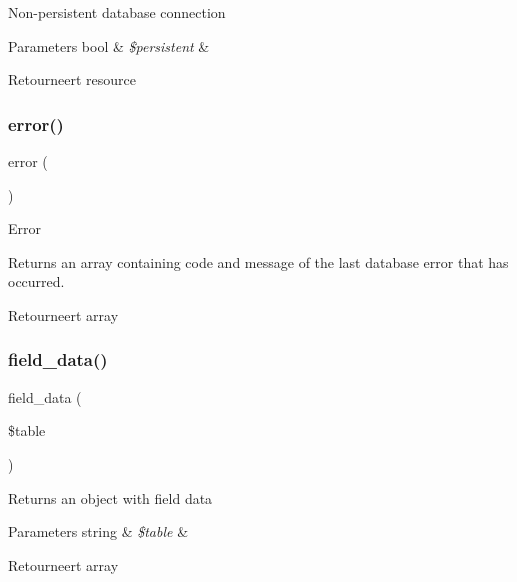 Non-\/persistent database connection


\begin{DoxyParams}[1]{Parameters}
bool & {\em \$persistent} & \\
\hline
\end{DoxyParams}
\begin{DoxyReturn}{Retourneert}
resource 
\end{DoxyReturn}
\mbox{\label{class_c_i___d_b__ibase__driver_a43b8d30b879d4f09ceb059b02af2bc02}} 
\subsubsection{\texorpdfstring{error()}{error()}}
{\footnotesize\ttfamily error (\begin{DoxyParamCaption}{ }\end{DoxyParamCaption})}

Error

Returns an array containing code and message of the last database error that has occurred.

\begin{DoxyReturn}{Retourneert}
array 
\end{DoxyReturn}
\mbox{\label{class_c_i___d_b__ibase__driver_a90355121e1ed009e0efdbd544ab56efa}} 
\subsubsection{\texorpdfstring{field\_data()}{field\_data()}}
{\footnotesize\ttfamily field\+\_\+data (\begin{DoxyParamCaption}\item[{}]{\$table }\end{DoxyParamCaption})}

Returns an object with field data


\begin{DoxyParams}[1]{Parameters}
string & {\em \$table} & \\
\hline
\end{DoxyParams}
\begin{DoxyReturn}{Retourneert}
array 
\end{DoxyReturn}
\mbox{\label{class_c_i___d_b__ibase__driver_a148521f11a2aad9f228af62f59ec5130}} 
